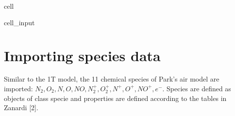 \documentclass[letterpaper,10pt,english]{jupyterBook}
\begin{document}
\begin{sphinxuseclass}{cell}
\begin{sphinxVerbatimInput}
\begin{sphinxuseclass}{cell_input}
\begin{sphinxVerbatim}[commandchars=\\\{\}]
             
            
              
             

                     

        
               
        
         
\end{sphinxVerbatim}

\end{sphinxuseclass}\end{sphinxVerbatimInput}

\end{sphinxuseclass}

\section{Importing species data}
\label{\detokenize{2_Temperature/_2T_Specie_class_definition:importing-species-data}}
\sphinxAtStartPar
Similar to the 1T model, the 11 chemical species of Park’s air model are imported: \(N_2, O_2, N, O, NO, N_2^+, O_2^+, N^+, O^+, NO^+, e^-\). Species are defined as objects of class specie and properties are defined according to the tables in Zanardi {[}2{]}.
\end{document}
